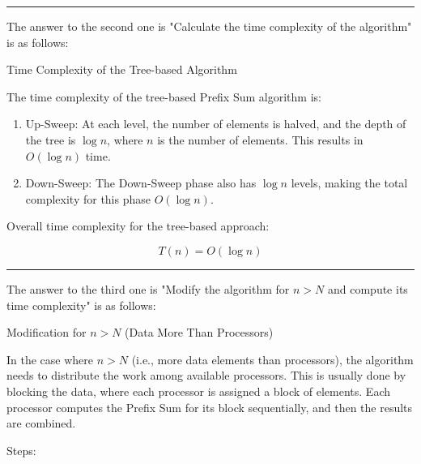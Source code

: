 \documentclass[a4paper,10pt]{article}
\begin{document}
        \begin{center}
            \noindent\rule{0.5\linewidth}{0.4pt}
        \end{center}


        The answer to the second one is "Calculate the time complexity of the algorithm" is as follows:

        {\bold Time Complexity of the Tree-based Algorithm}

        The time complexity of the tree-based Prefix Sum algorithm is:

        \begin{enumerate}
            
            \item {\bold Up-Sweep:} At each level, the number of elements is halved, and the depth of the tree is $\log n$, where $n$ is the number of elements. This results in $O(\log n)$ time.
            
            \item {\bold Down-Sweep:} The Down-Sweep phase also has $\log n$ levels, making the total complexity for this phase $O(\log n)$.

        \end{enumerate}

        Overall time complexity for the tree-based approach: 

        $$T(n)=O(\log n)$$

        \begin{center}
            \noindent\rule{0.5\linewidth}{0.4pt}
        \end{center}


        The answer to the third one is "Modify the algorithm for $n > N$ and compute its time complexity" is as follows:

        {\bold Modification for $n > N$ (Data More Than Processors)}

        In the case where $n > N$ (i.e., more data elements than processors), the algorithm needs to distribute the work among available processors. This is usually done by blocking the data, where each processor is assigned a block of elements. Each processor computes the Prefix Sum for its block sequentially, and then the results are combined.

        {\bold Steps:}
\end{document}
